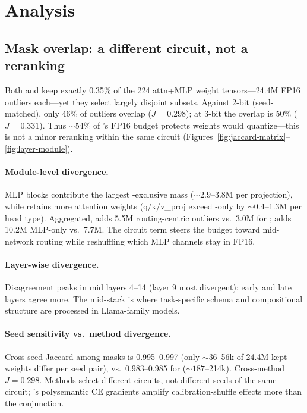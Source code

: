 \section{Analysis}
\label{sec:analysis}

\subsection{Mask overlap: a different circuit, not a reranking}
\label{sec:analysis-overlap}

Both \method{} and \baseline{} keep exactly 0.35\% of the 224
attn+MLP weight tensors---24.4M FP16 outliers each---yet they select largely
disjoint subsets. Against \baseline{} 2-bit (seed-matched), only 46\% of
\method{} outliers overlap ($J{=}0.298$); at 3-bit the overlap is 50\%
($J{=}0.331$). Thus ${\sim}54\%$ of \method{}'s FP16 budget protects weights
\baseline{} would quantize---this is not a minor reranking within the same
circuit (Figures~\ref{fig:jaccard-matrix}--\ref{fig:layer-module}).

\paragraph{Module-level divergence.}
MLP blocks contribute the largest \baseline{}-exclusive mass
(${\sim}2.9$--3.8M per projection), while \method{} retains more attention
weights (q/k/v\_proj exceed \baseline{}-only by ${\sim}0.4$--1.3M per head
type). Aggregated, \method{} adds 5.5M routing-centric outliers vs.\ 3.0M for
\baseline{}; \baseline{} adds 10.2M MLP-only vs.\ 7.7M. The circuit term
steers the budget toward mid-network routing while reshuffling which MLP
channels stay in FP16.

\paragraph{Layer-wise divergence.}
Disagreement peaks in mid layers 4--14 (layer 9 most divergent); early and
late layers agree more. The mid-stack is where task-specific schema and
compositional structure are processed in Llama-family models.

\paragraph{Seed sensitivity vs.\ method divergence.}
Cross-seed Jaccard among \method{} masks is 0.995--0.997 (only ${\sim}36$--56k
of 24.4M kept weights differ per seed pair), vs.\ 0.983--0.985 for \baseline{}
(${\sim}187$--214k). Cross-method $J{=}0.298$. Methods select different
circuits, not different seeds of the same circuit; \baseline{}'s polysemantic
CE gradients amplify calibration-shuffle effects more than the conjunction.

